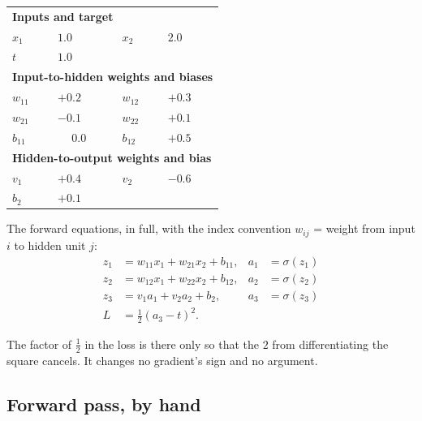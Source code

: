 \documentclass[11pt]{article}
\begin{document}
\begin{center}
\begin{tabular}{llll}
  \toprule
  \multicolumn{4}{l}{\textbf{Inputs and target}}\\
  $x_1$ & $1.0$ & $x_2$ & $2.0$ \\
  $t$ & $1.0$ & &\\
  \midrule
  \multicolumn{4}{l}{\textbf{Input-to-hidden weights and biases}}\\
  $w_{11}$ & $+0.2$ & $w_{12}$ & $+0.3$\\
  $w_{21}$ & $-0.1$ & $w_{22}$ & $+0.1$\\
  $b_{11}$ & $\phantom{+}0.0$ & $b_{12}$ & $+0.5$\\
  \midrule
  \multicolumn{4}{l}{\textbf{Hidden-to-output weights and bias}}\\
  $v_1$ & $+0.4$ & $v_2$ & $-0.6$\\
  $b_2$ & $+0.1$ & &\\
  \bottomrule
\end{tabular}
\end{center}

The forward equations, in full, with the index convention $w_{ij}$ = weight
from input $i$ to hidden unit $j$:
\begin{align}
  z_1 &= w_{11}x_1 + w_{21}x_2 + b_{11}, & a_1 &= \sigma(z_1)
    \label{eq:tf1}\\
  z_2 &= w_{12}x_1 + w_{22}x_2 + b_{12}, & a_2 &= \sigma(z_2)
    \label{eq:tf2}\\
  z_3 &= v_1a_1 + v_2a_2 + b_2,          & a_3 &= \sigma(z_3)
    \label{eq:tf3}\\
  L   &= \tfrac{1}{2}(a_3 - t)^2. & &
    \label{eq:tloss}
\end{align}

The factor of $\tfrac12$ in the loss is there only so that the $2$ from
differentiating the square cancels. It changes no gradient's sign and no
argument.

\subsection{Forward pass, by hand}
\label{sec:fwd}
\end{document}
